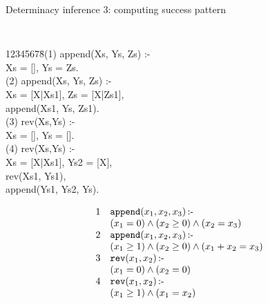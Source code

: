 \documentclass{beamer}
\def\neck           {{\, \mbox{:-} \,}}
\begin{document}
\begin{frame}{Determinacy inference 3: computing success pattern}
\vspace{\fill}

\begin{minipage}[t]{.45\textwidth}
{\tt \footnotesize 
\begin{tabbing} 12345678\=\kill (1) append(Xs, Ys, Zs) :- \\
\> Xs = [], Ys = Zs. \\
(2) append(Xs, Ys, Zs) :- \\
\> Xs = [X|Xs1], Zs = [X|Zs1], \\
\> append(Xs1, Ys, Zs1).\\
(3) rev(Xs,Ys) :- \\
\> Xs = [], Ys = []. \\
(4) rev(Xs,Ys) :- \\
\> Xs  = [X|Xs1], Ys2 = [X], \\
\> rev(Xs1, Ys1), \\
\> append(Ys1, Ys2, Ys).
\end{tabbing}}
\end{minipage} \hspace{\fill}
\begin{minipage}[t]{.45\textwidth}
\[
\begin{array}{@{}l@{\quad}l@{}}
1 & \mathtt{append}(x_1, x_2, x_3)\neck\\
  & (x_1 = 0) \wedge (x_2\geq 0) \wedge (x_2 = x_3)\\
2 & \mathtt{append}(x_1, x_2, x_3)\neck\\
  & (x_1 \geq 1) \wedge (x_2 \geq 0) \wedge (x_1 + x_2 = x_3) \\
3 & \mathtt{rev}(x_1, x_2)\neck\\
  & (x_1 =0 ) \wedge (x_2 =0) \\
4 & \mathtt{rev}(x_1, x_2)\neck\\
  & (x_1 \geq 1) \wedge (x_1 = x_2)
\end{array}
\]
\end{minipage}


\vspace{\fill}
\end{frame}
\end{document}

